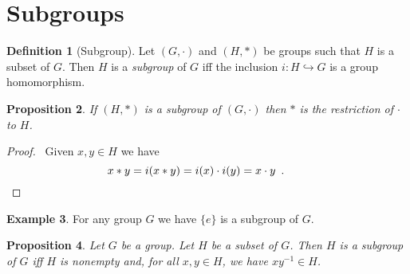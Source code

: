 \documentclass{book}
\let\qed\relax
\newtheorem{prop}{Proposition}[chapter]
\theoremstyle{definition}
\newtheorem{df}[prop]{Definition}
\newtheorem{ex}[prop]{Example}
\newcommand{\inv}[1]{\ensuremath{{#1}^{-1}}}
\begin{document}
\section{Subgroups}

\begin{df}[Subgroup]
Let $(G,\cdot)$ and $(H,*)$ be groups such that $H$ is a subset of $G$. Then $H$ is a \emph{subgroup} of $G$ iff the inclusion $i : H \hookrightarrow G$ is a group homomorphism.
\end{df}

\begin{prop}
If $(H,*)$ is a subgroup of $(G,\cdot)$ then $*$ is the restriction of $\cdot$ to $H$.
\end{prop}

\begin{proof}
\pf\ Given $x,y \in H$ we have
\[ x * y = i(x * y) = i(x) \cdot i(y) = x \cdot y \enspace .  \qquad \qed \]
\end{proof}

\begin{ex}
For any group $G$ we have $\{e\}$ is a subgroup of $G$.
\end{ex}

\begin{prop}
Let $G$ be a group. Let $H$ be a subset of $G$. Then $H$ is a subgroup of $G$ iff $H$ is nonempty and, for all $x,y \in H$, we have $x \inv{y} \in H$.
\end{prop}
\end{document}
